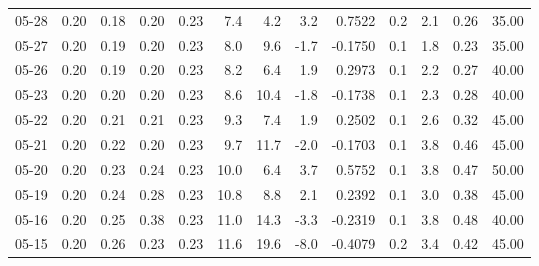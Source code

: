 \begin{threeparttable}
{\begin{tabular}{lrrrrrrrrrrrr}
  05-28 &          0.20 &          0.18 &          0.20 &        0.23 &                 7.4 &                 4.2 &        3.2 &       0.7522 &                 0.2 &              2.1 &            0.26 &                  35.00 \\
  05-27 &          0.20 &          0.19 &          0.20 &        0.23 &                 8.0 &                 9.6 &       -1.7 &      -0.1750 &                 0.1 &              1.8 &            0.23 &                  35.00 \\
  05-26 &          0.20 &          0.19 &          0.20 &        0.23 &                 8.2 &                 6.4 &        1.9 &       0.2973 &                 0.1 &              2.2 &            0.27 &                  40.00 \\
  05-23 &          0.20 &          0.20 &          0.20 &        0.23 &                 8.6 &                10.4 &       -1.8 &      -0.1738 &                 0.1 &              2.3 &            0.28 &                  40.00 \\
  05-22 &          0.20 &          0.21 &          0.21 &        0.23 &                 9.3 &                 7.4 &        1.9 &       0.2502 &                 0.1 &              2.6 &            0.32 &                  45.00 \\
  05-21 &          0.20 &          0.22 &          0.20 &        0.23 &                 9.7 &                11.7 &       -2.0 &      -0.1703 &                 0.1 &              3.8 &            0.46 &                  45.00 \\
  05-20 &          0.20 &          0.23 &          0.24 &        0.23 &                10.0 &                 6.4 &        3.7 &       0.5752 &                 0.1 &              3.8 &            0.47 &                  50.00 \\
  05-19 &          0.20 &          0.24 &          0.28 &        0.23 &                10.8 &                 8.8 &        2.1 &       0.2392 &                 0.1 &              3.0 &            0.38 &                  45.00 \\
  05-16 &          0.20 &          0.25 &          0.38 &        0.23 &                11.0 &                14.3 &       -3.3 &      -0.2319 &                 0.1 &              3.8 &            0.48 &                  40.00 \\
  05-15 &          0.20 &          0.26 &          0.23 &        0.23 &                11.6 &                19.6 &       -8.0 &      -0.4079 &                 0.2 &              3.4 &            0.42 &                  45.00 \\

\end{tabular}}
\end{threeparttable}

